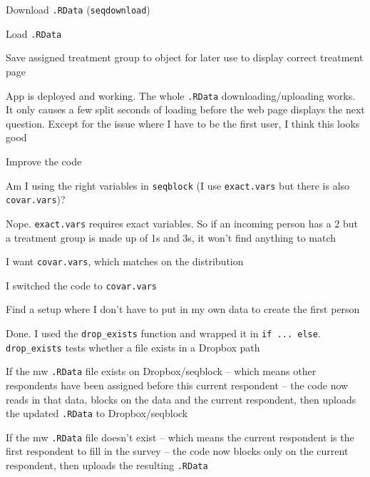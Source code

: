 \documentclass[12pt]{article}
\begin{document}
\begin{coi}
\begin{coi}
\begin{coi}
\begin{coi}
								\item Download \texttt{.RData} (\texttt{seqdownload})
								\item Load \texttt{.RData}
								\item Save assigned treatment group to object for later use to display correct treatment page
							\end{coi}
					\end{coi}
				\item App is deployed and working. The whole \texttt{.RData} downloading/uploading works. It only causes a few split seconds of loading before the web page displays the next question. Except for the issue where I have to be the first user, I think this looks good
			\end{coi}
		\item Improve the code
			\begin{coi}
				\item Am I using the right variables in \texttt{seqblock} (I use \texttt{exact.vars} but there is also \texttt{covar.vars})?
					\begin{coi}
						\item Nope. \texttt{exact.vars} requires exact variables. So if an incoming person has a 2 but a treatment group is made up of 1s and 3s, it won't find anything to match
						\item I want \texttt{covar.vars}, which matches on the distribution
						\item I switched the code to \texttt{covar.vars}
					\end{coi}
				\item Find a setup where I don't have to put in my own data to create the first person
					\begin{coi}
						\item Done. I used the \texttt{drop\_exists} function and wrapped it in \texttt{if ... else}. \texttt{drop\_exists} tests whether a file exists in a Dropbox path
						\item If the mw \texttt{.RData} file exists on Dropbox/seqblock -- which means other respondents have been assigned before this current respondent -- the code now reads in that data, blocks on the data and the current respondent, then uploads the updated \texttt{.RData} to Dropbox/seqblock
						\item If the mw \texttt{.RData} file doesn't exist -- which means the current respondent is the first respondent to fill in the survey --  the code now blocks only on the current respondent, then uploads the resulting \texttt{.RData}

\end{coi}
\end{coi}
\end{coi}
\end{document}
